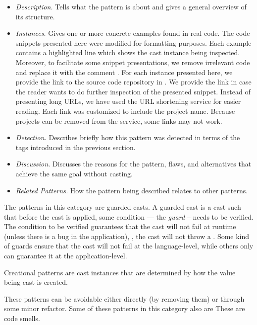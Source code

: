 \begin{itemize}
\item \textit{Description.}
Tells what the pattern is about and gives a general overview of its structure.
\item \textit{Instances.}
Gives one or more concrete examples found in real code.
The code snippets presented here were modified for formatting purposes.
Each example contains a highlighted line which shows the cast instance being inspected.
Moreover, to facilitate some snippet presentations,
we remove irrelevant code and replace it with the
comment \code{/* [...] */}.
For each instance presented here, we provide the link to the source code repository in \lgtm{}.
We provide the link in case the reader wants to do further inspection of the presented snippet.
Instead of presenting long \lgtm{} URLs, we have used the URL shortening service
\href{https://bitly.com/}{\bitly} for easier reading.
Each \bitly{} link was customized to include the project name.
Because projects can be removed from the \lgtm{} service,
some links may not work.
\item \textit{Detection.}
Describes briefly how this pattern was detected in terms of the tags introduced in the previous section.
\item \textit{Discussion.}
Discusses the reasons for the pattern, flaws, and alternatives that achieve the same goal without casting.
\item \textit{Related Patterns.}
How the pattern being described relates to other patterns.
\end{itemize}

The patterns in this category are guarded casts.
A guarded cast is a cast such that before the cast is applied,
some condition --- the \emph{guard} -- needs to be verified.
The condition to be verified guarantees that the cast will not fail at runtime (unless there is a bug in the application), \ie,
the cast will not throw a .
Some kind of guards ensure that the cast will not fail at the language-level,
while others only can guarantee it at the application-level.

Creational patterns are cast instances that are determined by how the value being cast is created.

These patterns can be avoidable either directly (by removing them)
or through some minor refactor.
Some of these patterns in this category also are 
These are code smells.


